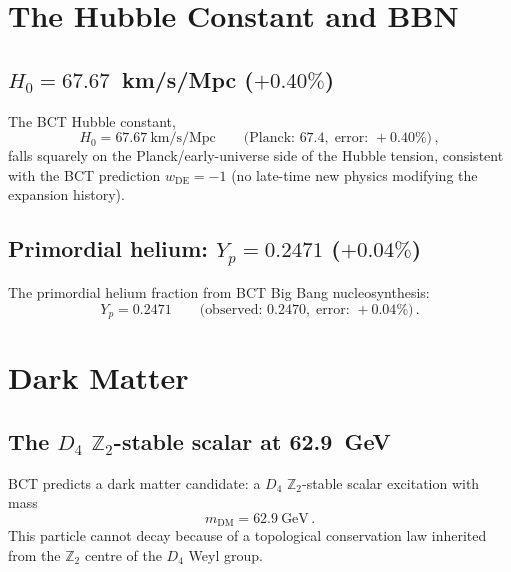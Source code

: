 \documentclass[review,number,sort&compress]{elsarticle}
\newcommand{\Dfour}{D_4}
\begin{document}
\section{The Hubble Constant and BBN}
\label{sec:hubble}

\subsection{$H_0 = 67.67$~km/s/Mpc ($+0.40\%$)}

The BCT Hubble constant,
\begin{equation}
  H_0 = 67.67~\text{km/s/Mpc} \qquad
  \bigl(\text{Planck: } 67.4,\;\text{error: } +0.40\%\bigr)\,,
  \label{eq:H0}
\end{equation}
falls squarely on the Planck/early-universe side of the Hubble tension,
consistent with the BCT prediction $w_{\mathrm{DE}} = -1$ (no late-time
new physics modifying the expansion history).

\subsection{Primordial helium: $Y_p = 0.2471$ ($+0.04\%$)}

The primordial helium fraction from BCT Big Bang nucleosynthesis:
\begin{equation}
  Y_p = 0.2471 \qquad
  \bigl(\text{observed: } 0.2470,\;\text{error: } +0.04\%\bigr)\,.
  \label{eq:Yp}
\end{equation}

\section{Dark Matter}
\label{sec:DM}

\subsection{The $\Dfour$ $\mathbb{Z}_2$-stable scalar at 62.9~GeV}

BCT predicts a dark matter candidate: a $\Dfour$ $\mathbb{Z}_2$-stable
scalar excitation with mass
\begin{equation}
  m_{\mathrm{DM}} = 62.9~\text{GeV}\,.
  \label{eq:mDM}
\end{equation}
This particle cannot decay because of a topological conservation law
inherited from the $\mathbb{Z}_2$ centre of the $\Dfour$ Weyl group.
\end{document}
